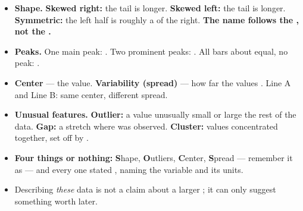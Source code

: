 \documentclass[12pt]{article}
\begin{document}
\boxguard[14]
\begin{tcolorbox}[enhanced, colback=sky, colframe=navy, boxrule=0.8pt, arc=2mm,
    left=3mm, right=3mm, top=1.5mm, bottom=1.5mm, breakable,
    fonttitle=\bfseries\small\color{white}, title={QuickNotes: Describing a Quantitative Distribution},
    attach boxed title to top left={yshift=-2mm, xshift=4mm},
    boxed title style={colback=navy, colframe=navy, arc=1.5mm}]
\small
\begin{itemize}[leftmargin=1.1em, itemsep=3pt]
  \item \textbf{Shape.} \textbf{Skewed right:} the  tail is longer.
        \textbf{Skewed left:} the  tail is longer. \textbf{Symmetric:} the left
        half is roughly a  of the right.
        \textbf{The name follows the , not the .}
  \item \textbf{Peaks.} One main peak: . Two prominent peaks: .
        All bars about equal, no peak: .
  \item \textbf{Center} --- the  value. \textbf{Variability (spread)} --- how far
        the values . Line A and Line B: same center, different spread.
  \item \textbf{Unusual features.} \textbf{Outlier:} a value unusually small or large
         the rest of the data. \textbf{Gap:} a stretch where  was
        observed. \textbf{Cluster:} values concentrated together, set off by .
  \item \textbf{Four things or nothing:} \textbf{S}hape, \textbf{O}utliers, \textbf{C}enter,
        \textbf{S}pread --- remember it as  --- and every one stated
        , naming the variable and its units.
  \item Describing \emph{these} data is not a claim about a larger ; it can only
        suggest something worth  later.
\end{itemize}
\end{tcolorbox}
\end{document}
